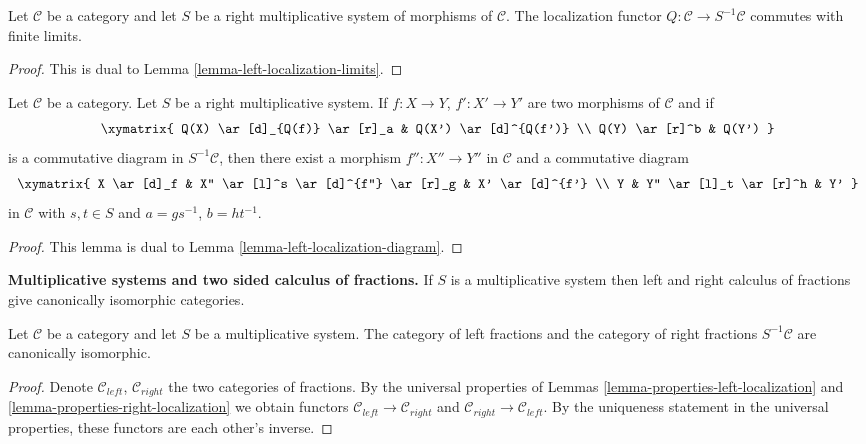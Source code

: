 \begin{lemma}
\label{lemma-right-localization-limits}
Let $\mathcal{C}$ be a category and let $S$ be a right multiplicative
system of morphisms of $\mathcal{C}$. The localization functor
$Q : \mathcal{C} \to S^{-1}\mathcal{C}$ commutes with finite limits.
\end{lemma}

\begin{proof}
This is dual to Lemma \ref{lemma-left-localization-limits}.
\end{proof}

\begin{lemma}
\label{lemma-right-localization-diagram}
Let $\mathcal{C}$ be a category. Let $S$ be a right multiplicative
system. If $f : X \to Y$, $f' : X' \to Y'$ are two morphisms of
$\mathcal{C}$ and if
$$
\xymatrix{
Q(X) \ar[d]_{Q(f)} \ar[r]_a & Q(X') \ar[d]^{Q(f')} \\
Q(Y) \ar[r]^b & Q(Y')
}
$$
is a commutative diagram in $S^{-1}\mathcal{C}$, then there exist
a morphism $f'' : X'' \to Y''$ in $\mathcal{C}$ and a commutative
diagram
$$
\xymatrix{
X \ar[d]_f & X'' \ar[l]^s \ar[d]^{f''} \ar[r]_g & X' \ar[d]^{f'} \\
Y & Y'' \ar[l]_t \ar[r]^h & Y'
}
$$
in $\mathcal{C}$ with $s, t \in S$ and $a = gs^{-1}$, $b = ht^{-1}$.
\end{lemma}

\begin{proof}
This lemma is dual to
Lemma \ref{lemma-left-localization-diagram}.
\end{proof}

\noindent
{\bf Multiplicative systems and two sided calculus of fractions.}
If $S$ is a multiplicative system then left and right calculus of
fractions give canonically isomorphic categories.

\begin{lemma}
\label{lemma-multiplicative-system}
Let $\mathcal{C}$ be a category and let $S$ be a multiplicative system.
The category of left fractions and the category of right fractions
$S^{-1}\mathcal{C}$ are canonically isomorphic.
\end{lemma}

\begin{proof}
Denote $\mathcal{C}_{left}$, $\mathcal{C}_{right}$ the two categories
of fractions. By the universal properties of
Lemmas \ref{lemma-properties-left-localization} and
\ref{lemma-properties-right-localization}
we obtain functors $\mathcal{C}_{left} \to \mathcal{C}_{right}$
and $\mathcal{C}_{right} \to \mathcal{C}_{left}$.
By the uniqueness statement in the universal properties, these
functors are each other's inverse.
\end{proof}


